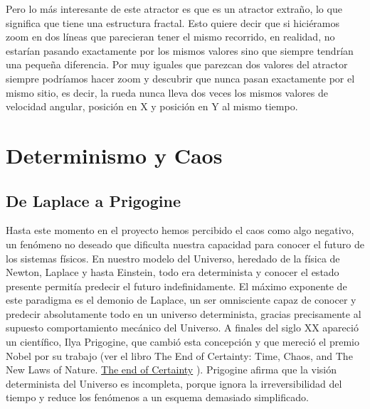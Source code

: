 \documentclass[
  10pt,
  a4paper,
  DIV=11,
  numbers=noendperiod,
  open=any]{scrreprt}
\makeatletter
\newcommand*\pandocbounded[1]{%
  \sbox\pandoc@box{#1}%
  \Gscale@div\@tempa{\textheight}{\dimexpr\ht\pandoc@box+\dp\pandoc@box\relax}%
  \Gscale@div\@tempb{\linewidth}{\wd\pandoc@box}%
  \ifdim\@tempb\p@<\@tempa\p@\let\@tempa\@tempb\fi%
  \ifdim\@tempa\p@<\p@\scalebox{\@tempa}{\usebox\pandoc@box}%
  \else\usebox{\pandoc@box}%
  \fi%
}
\numberwithin{equation}{chapter}
\numberwithin{equation}{section}
\renewcommand{\[}{\begin{equation}}
\renewcommand{\]}{\end{equation}}
\providecommand{\pandocbounded}[1]{#1}%
\renewcommand{\pandocbounded}[1]{\begingroup\centering #1\par\endgroup}
\makeatother
\begin{document}
Pero lo más interesante de este atractor es que es un atractor extraño,
lo que significa que tiene una estructura fractal. Esto quiere decir que
si hiciéramos zoom en dos líneas que parecieran tener el mismo
recorrido, en realidad, no estarían pasando exactamente por los mismos
valores sino que siempre tendrían una pequeña diferencia. Por muy
iguales que parezcan dos valores del atractor siempre podríamos hacer
zoom y descubrir que nunca pasan exactamente por el mismo sitio, es
decir, la rueda nunca lleva dos veces los mismos valores de velocidad
angular, posición en X y posición en Y al mismo tiempo.


\part{Determinismo y Caos}

\chapter{De Laplace a Prigogine}\label{de-laplace-a-prigogine}

Hasta este momento en el proyecto hemos percibido el caos como algo
negativo, un fenómeno no deseado que dificulta nuestra capacidad para
conocer el futuro de los sistemas físicos. En nuestro modelo del
Universo, heredado de la física de Newton, Laplace y hasta Einstein,
todo era determinista y conocer el estado presente permitía predecir el
futuro indefinidamente. El máximo exponente de este paradigma es el demonio de Laplace, un ser omnisciente capaz de conocer y predecir absolutamente todo en un universo determinista, gracias precisamente al supuesto comportamiento mecánico del Universo.  A finales del siglo XX apareció un científico,
Ilya Prigogine, que cambió esta concepción y que mereció el premio Nobel
por su trabajo (ver el libro The End of Certainty: Time, Chaos, and The
New Laws of Nature.
\href{https://kremesti.com/portfolio/technical_writing/Academic_Research_Papers/End_of_Certainty.htm}{The
end of Certainty} ). Prigogine afirma que la visión determinista del
Universo es incompleta, porque ignora la irreversibilidad del tiempo y
reduce los fenómenos a un esquema demasiado simplificado.
\end{document}
